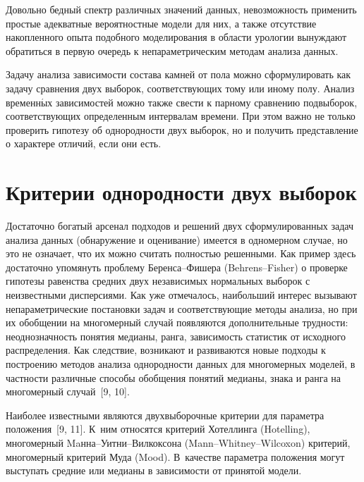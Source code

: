 \begin{multicols}{2}
      
      Довольно бедный спектр различных значений данных, невозможность применить 
простые адекватные вероятностные модели для них, а также отсутствие накопленного опыта 
подобного моделирования в области урологии вынуждают обратиться в первую очередь к 
непараметрическим методам анализа данных.
      
      Задачу анализа зависимости состава камней от пола можно сформулировать как 
задачу сравнения двух выборок, соответствующих тому или иному полу. Анализ 
временн$\acute{\mbox{ы}}$х зависимостей можно также свести к парному сравнению 
подвыборок, соответствующих определенным интервалам времени. При этом важно не 
только проверить гипотезу об однородности двух выборок, но и получить представление о 
характере отличий, если они есть. 
      
\section{Критерии однородности двух выборок}

      Достаточно богатый арсенал подходов и решений двух сформулированных задач 
анализа данных (обнаружение и оценивание) имеется в одномерном случае, но это не 
означает, что их можно считать полностью решенными. Как пример здесь достаточно 
упомянуть проблему Бе\-рен\-са--Фи\-ше\-ра (Behrens--Fi\-sher) о проверке гипотезы 
равенства средних двух независимых нормальных выборок с неизвестными дисперсиями. 
Как уже отмечалось, наибольший интерес вызывают непараметрические постановки задач и 
соответствующие методы анализа, но при их обобщении на многомерный случай появляются 
дополнительные трудности: неоднозначность понятия медианы, ранга, зависимость 
статистик от исходного распределения. Как следствие, возникают и развиваются новые 
подходы к построению методов анализа однородности данных для многомерных моделей, в 
частности различные способы обобщения понятий медианы, знака и ранга на многомерный 
случай~[9, 10]. 
      
      Наиболее известными являются двухвыборочные критерии для параметра 
положения~[9, 11]. К~ним относятся критерий Хотеллинга (Hotelling), многомерный 
      Maн\-на--Уит\-ни--Вил\-кок\-со\-на (Mann--Whitney--Wil\-coxon) критерий, 
многомерный критерий Муда (Mood). В~качестве параметра положения могут выступать 
средние или медианы в за\-ви\-си\-мости от принятой модели.
      

\end{multicols}
